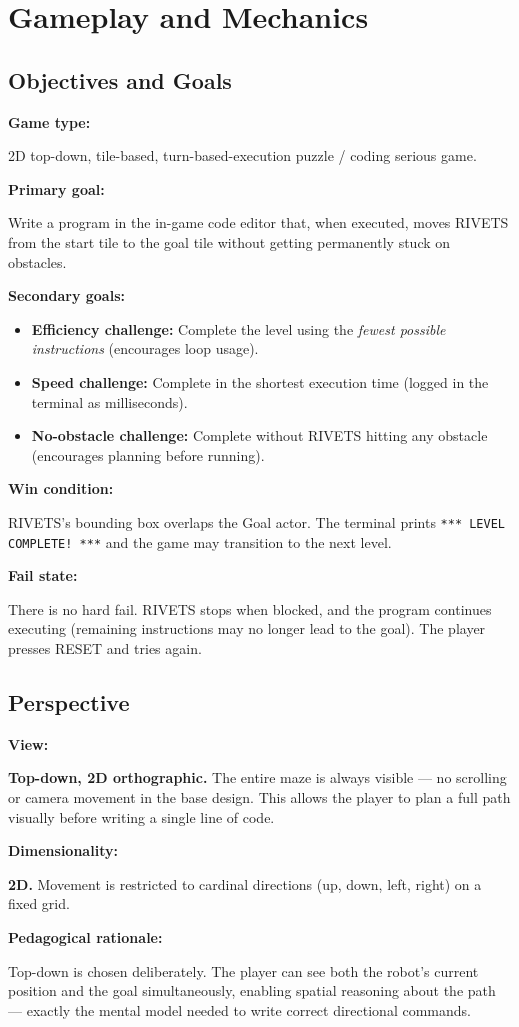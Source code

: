 \documentclass[12pt,a4paper]{article}
\newcommand{\gddfield}[2]{%
  \noindent\begin{minipage}[t]{3.5cm}\bfseries\color{accent}\sffamily#1\end{minipage}%
  \hspace{8pt}%
  \begin{minipage}[t]{\dimexpr\linewidth-3.5cm-8pt\relax}%
    #2
  \end{minipage}\par\smallskip}
\begin{document}
\section{Gameplay and Mechanics}

\subsection{Objectives and Goals}

\begin{tcolorbox}[gddbox, title={Objectives / Goals}]
\gddfield{Game type:}{2D top-down, tile-based, turn-based-execution puzzle / coding serious game.}
\gddfield{Primary goal:}{Write a program in the in-game code editor that, when executed, moves RIVETS from the start tile to the goal tile without getting permanently stuck on obstacles.}
\gddfield{Secondary goals:}{%
\begin{itemize}[noitemsep]
  \item \textbf{Efficiency challenge:} Complete the level using the \emph{fewest possible instructions} (encourages loop usage).
  \item \textbf{Speed challenge:} Complete in the shortest execution time (logged in the terminal as milliseconds).
  \item \textbf{No-obstacle challenge:} Complete without RIVETS hitting any obstacle (encourages planning before running).
\end{itemize}
}
\gddfield{Win condition:}{RIVETS's bounding box overlaps the Goal actor. The terminal prints \texttt{*** LEVEL COMPLETE! ***} and the game may transition to the next level.}
\gddfield{Fail state:}{There is no hard fail. RIVETS stops when blocked, and the program continues executing (remaining instructions may no longer lead to the goal). The player presses RESET and tries again.}
\end{tcolorbox}

\subsection{Perspective}

\begin{tcolorbox}[gddbox, title={Perspective}]
\gddfield{View:}{\textbf{Top-down, 2D orthographic.} The entire maze is always visible — no scrolling or camera movement in the base design. This allows the player to plan a full path visually before writing a single line of code.}
\gddfield{Dimensionality:}{\textbf{2D.} Movement is restricted to cardinal directions (up, down, left, right) on a fixed grid.}
\gddfield{Pedagogical rationale:}{Top-down is chosen deliberately. The player can see both the robot's current position and the goal simultaneously, enabling spatial reasoning about the path — exactly the mental model needed to write correct directional commands.}
\end{tcolorbox}
\end{document}

